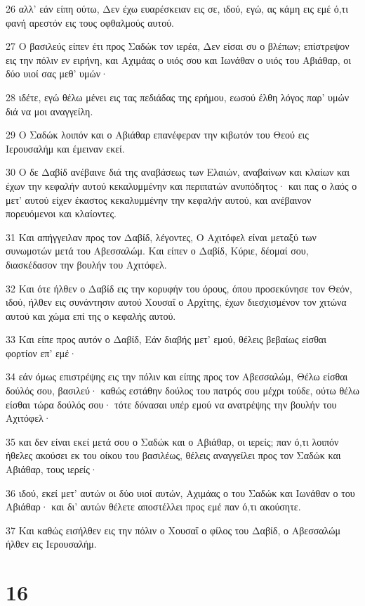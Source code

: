 \par 26 αλλ' εάν είπη ούτω, Δεν έχω ευαρέσκειαν εις σε, ιδού, εγώ, ας κάμη εις εμέ ό,τι φανή αρεστόν εις τους οφθαλμούς αυτού.
\par 27 Ο βασιλεύς είπεν έτι προς Σαδώκ τον ιερέα, Δεν είσαι συ ο βλέπων; επίστρεψον εις την πόλιν εν ειρήνη, και Αχιμάας ο υιός σου και Ιωνάθαν ο υιός του Αβιάθαρ, οι δύο υιοί σας μεθ' υμών·
\par 28 ιδέτε, εγώ θέλω μένει εις τας πεδιάδας της ερήμου, εωσού έλθη λόγος παρ' υμών διά να μοι αναγγείλη.
\par 29 Ο Σαδώκ λοιπόν και ο Αβιάθαρ επανέφεραν την κιβωτόν του Θεού εις Ιερουσαλήμ και έμειναν εκεί.
\par 30 Ο δε Δαβίδ ανέβαινε διά της αναβάσεως των Ελαιών, αναβαίνων και κλαίων και έχων την κεφαλήν αυτού κεκαλυμμένην και περιπατών ανυπόδητος· και πας ο λαός ο μετ' αυτού είχεν έκαστος κεκαλυμμένην την κεφαλήν αυτού, και ανέβαινον πορευόμενοι και κλαίοντες.
\par 31 Και απήγγειλαν προς τον Δαβίδ, λέγοντες, Ο Αχιτόφελ είναι μεταξύ των συνωμοτών μετά του Αβεσσαλώμ. Και είπεν ο Δαβίδ, Κύριε, δέομαί σου, διασκέδασον την βουλήν του Αχιτόφελ.
\par 32 Και ότε ήλθεν ο Δαβίδ εις την κορυφήν του όρους, όπου προσεκύνησε τον Θεόν, ιδού, ήλθεν εις συνάντησιν αυτού Χουσαΐ ο Αρχίτης, έχων διεσχισμένον τον χιτώνα αυτού και χώμα επί της ο κεφαλής αυτού.
\par 33 Και είπε προς αυτόν ο Δαβίδ, Εάν διαβής μετ' εμού, θέλεις βεβαίως είσθαι φορτίον επ' εμέ·
\par 34 εάν όμως επιστρέψης εις την πόλιν και είπης προς τον Αβεσσαλώμ, Θέλω είσθαι δούλός σου, βασιλεύ· καθώς εστάθην δούλος του πατρός σου μέχρι τούδε, ούτω θέλω είσθαι τώρα δούλός σου· τότε δύνασαι υπέρ εμού να ανατρέψης την βουλήν του Αχιτόφελ·
\par 35 και δεν είναι εκεί μετά σου ο Σαδώκ και ο Αβιάθαρ, οι ιερείς; παν ό,τι λοιπόν ήθελες ακούσει εκ του οίκου του βασιλέως, θέλεις αναγγείλει προς τον Σαδώκ και Αβιάθαρ, τους ιερείς·
\par 36 ιδού, εκεί μετ' αυτών οι δύο υιοί αυτών, Αχιμάας ο του Σαδώκ και Ιωνάθαν ο του Αβιάθαρ· και δι' αυτών θέλετε αποστέλλει προς εμέ παν ό,τι ακούσητε.
\par 37 Και καθώς εισήλθεν εις την πόλιν ο Χουσαΐ ο φίλος του Δαβίδ, ο Αβεσσαλώμ ήλθεν εις Ιερουσαλήμ.

\chapter{16}

